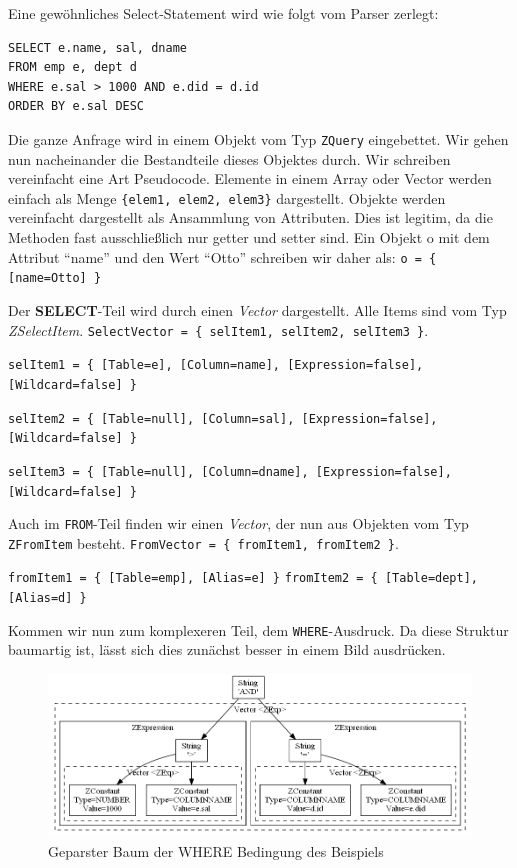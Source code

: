 Eine gewöhnliches Select-Statement wird wie folgt vom Parser zerlegt:
\begin{verbatim}
SELECT e.name, sal, dname 
FROM emp e, dept d 
WHERE e.sal > 1000 AND e.did = d.id 
ORDER BY e.sal DESC\end{verbatim}

Die ganze Anfrage wird in einem Objekt vom Typ \verb|ZQuery| eingebettet. Wir gehen nun nacheinander die Bestandteile dieses Objektes durch. Wir schreiben vereinfacht eine Art Pseudocode. Elemente in einem Array oder Vector werden einfach als Menge \verb|{elem1, elem2, elem3}| dargestellt. Objekte werden vereinfacht dargestellt als Ansammlung von Attributen. Dies ist legitim, da die Methoden fast ausschließlich nur getter und setter sind. Ein Objekt o mit dem Attribut ``name'' und den Wert ``Otto'' schreiben wir daher als: 
\verb|o = { [name=Otto] }|

Der \textbf{SELECT}-Teil wird durch einen \textit{Vector} dargestellt. Alle Items sind vom Typ \textit{ZSelectItem}. \verb|SelectVector = { selItem1, selItem2, selItem3 }|.

\verb|selItem1 = { [Table=e], [Column=name], [Expression=false], [Wildcard=false] }|

\verb|selItem2 = { [Table=null], [Column=sal], [Expression=false], [Wildcard=false] }|

\verb|selItem3 = { [Table=null], [Column=dname], [Expression=false], [Wildcard=false] }|

Auch im \verb|FROM|-Teil finden wir einen \textit{Vector}, der nun aus Objekten vom Typ \verb|ZFromItem| besteht. \verb|FromVector = { fromItem1, fromItem2 }|.

\verb|fromItem1 = { [Table=emp], [Alias=e] }|
\verb|fromItem2 = { [Table=dept], [Alias=d] }|

Kommen wir nun zum komplexeren Teil, dem \verb|WHERE|-Ausdruck. Da diese Struktur baumartig ist, lässt sich dies zunächst besser in einem Bild ausdrücken.

\begin{figure}[h]
\includegraphics[scale=0.51]{Bilder/parserbaum.png}
\caption{Geparster Baum der WHERE Bedingung des Beispiels}
\label{fig:parseTree}
\end{figure}

